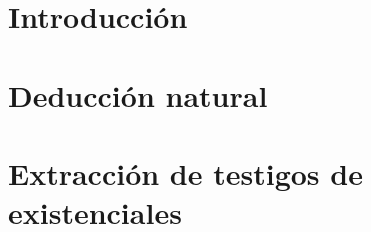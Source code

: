 \documentclass[11pt,a4paper]{tesis}
\begin{document}

\def\autor{Manuel Panichelli}
\def\tituloTesis{
    PPA \vspace{.2cm} \\
    Un asistente de demostraciones tipo\\
    Mizar para lógica clásica de primer orden,\\
    con extracción de testigos basada\vspace{.1cm}\\
    en la traducción de Friedman
}
\def\runtitulo{PPA: Un asistente de demostraciones tipo Mizar para lógica clásica de primer orden con extracción de testigos basada en la traducción de Friedman}
\def\runtitle{PPA: a Mizar-like proof-assistant for classical first-order logic with witness extraction based on Friedman's translation}
\def\director{Pablo Barenbaum}
\def\lugar{Buenos Aires, 2024}



\frontmatter
\pagestyle{empty}


\cleardoublepage


\cleardoublepage


\cleardoublepage
\tableofcontents

\mainmatter
\pagestyle{headings}


\chapter{Introducción}



\chapter{Deducción natural}




\chapter{Extracción de testigos de existenciales}



\backmatter
\printbibliography
\end{document}
